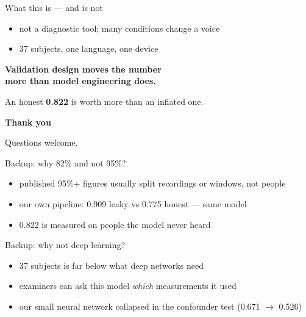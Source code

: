 \documentclass[aspectratio=169,11pt]{beamer}
\newcommand{\bigclaim}[1]{\begin{center}\Large\bfseries #1\end{center}}
\begin{document}
\begin{frame}{What this is --- and is not}
\vspace{1mm}
\begin{itemize}
  \item not a diagnostic tool; many conditions change a voice
  \item 37 subjects, one language, one device
\end{itemize}
\vspace{5mm}
\bigclaim{Validation design moves the number\\more than model
engineering does.}
\vspace{2mm}
\centering An honest \textcolor{honest}{\textbf{0.822}} is worth more
than an inflated one.
\end{frame}

\begin{frame}[c]{}
\bigclaim{Thank you}
\vspace{4mm}
\centering Questions welcome.
\end{frame}

\appendix

\begin{frame}{Backup: why 82\% and not 95\%?}
\begin{itemize}
  \item published 95\%+ figures usually split recordings or windows,
        not people
  \item our own pipeline: 0.909 leaky vs 0.775 honest --- same model
  \item 0.822 is measured on people the model never heard
\end{itemize}
\end{frame}

\begin{frame}{Backup: why not deep learning?}
\begin{itemize}
  \item 37 subjects is far below what deep networks need
  \item examiners can ask this model \emph{which} measurements it used
  \item our small neural network collapsed in the confounder test
        (0.671 $\to$ 0.526)
\end{itemize}
\end{frame}
\end{document}
